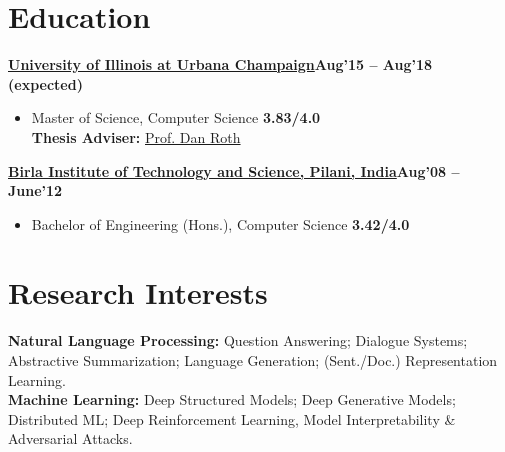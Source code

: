 \documentclass[margin,line]{templates/resume}
\newcommand{\compresslist}{%
\setlength{\itemsep}{3pt}%
\setlength{\parskip}{0pt}%
\setlength{\parsep}{0pt}%
}
\begin{document}
\begin{resume}
\section{\mysidestyle Education}
    \textbf{\href{https://cs.illinois.edu/}{University of Illinois at Urbana Champaign}}\hfill {\textbf{Aug'15 -- Aug'18 (expected)}}
    \begin{itemize}[leftmargin=*]\compresslist
        \item[]Master of Science, Computer Science \hfill {\textbf{3.83/4.0}}\\
    \textbf{Thesis Adviser:} \href{http://www.cis.upenn.edu/~danroth/}{Prof. Dan Roth}
    \end{itemize}
    \vspace{-0.2cm}
    \textbf{\href{http://www.bits-pilani.ac.in/}{Birla Institute of Technology and Science, Pilani, India}}\hfill{\textbf{Aug'08 -- June'12}}
    \begin{itemize}[leftmargin=*]\compresslist
        \item[]Bachelor of Engineering (Hons.), Computer Science \hfill{\textbf{3.42/4.0}}
    \end{itemize}

\vspace{-0.1cm}    
\section{\mysidestyle Research Interests}


\textbf{Natural Language Processing:} Question Answering; Dialogue Systems; Abstractive Summarization; Language Generation; (Sent./Doc.) Representation Learning. \\
\textbf{Machine Learning:} Deep Structured Models; Deep Generative Models; Distributed ML; Deep Reinforcement Learning, Model Interpretability \& Adversarial Attacks.


\end{resume}
\end{document}
